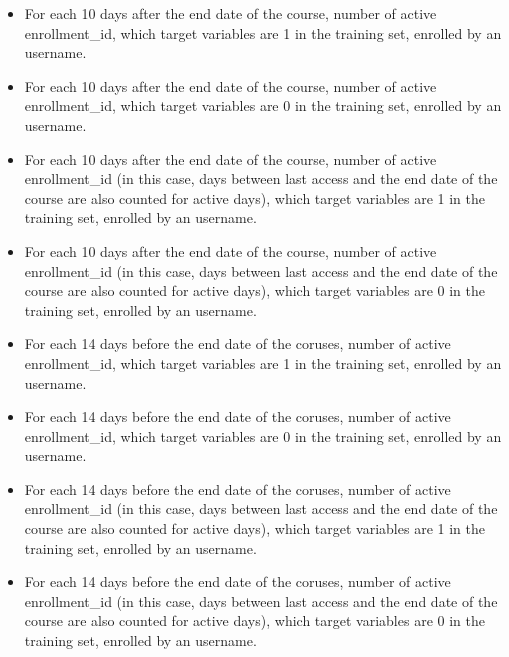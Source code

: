 \begin{itemize}
  \setlength\itemsep{0em}
  \item For each 10 days after the end date of the course, number of active enrollment\_id, which target variables are 1 in the training set, enrolled by an username.
  \item For each 10 days after the end date of the course, number of active enrollment\_id, which target variables are 0 in the training set, enrolled by an username.
  \item For each 10 days after the end date of the course, number of active enrollment\_id (in this case, days between last access and the end date of the course are also counted for active days), which target variables are 1 in the training set, enrolled by an username.
  \item For each 10 days after the end date of the course, number of active enrollment\_id (in this case, days between last access and the end date of the course are also counted for active days), which target variables are 0 in the training set, enrolled by an username.
  \item For each 14 days before the end date of the coruses, number of active enrollment\_id, which target variables are 1 in the training set, enrolled by an username.
  \item For each 14 days before the end date of the coruses, number of active enrollment\_id, which target variables are 0 in the training set, enrolled by an username.
  \item For each 14 days before the end date of the coruses, number of active enrollment\_id (in this case, days between last access and the end date of the course are also counted for active days), which target variables are 1 in the training set, enrolled by an username.
  \item For each 14 days before the end date of the coruses, number of active enrollment\_id (in this case, days between last access and the end date of the course are also counted for active days), which target variables are 0 in the training set, enrolled by an username.
\end{itemize}

